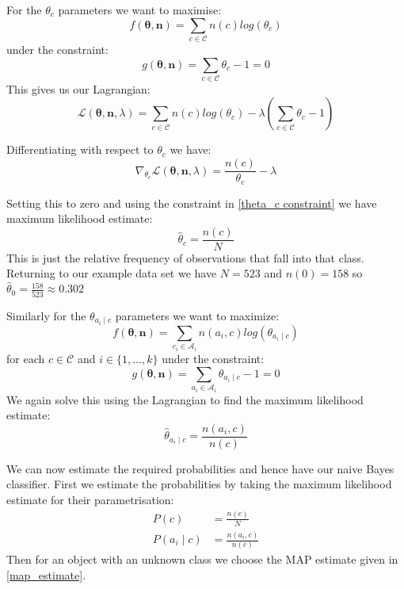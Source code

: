 For the $\theta_c$ parameters we want to maximise:
\begin{equation}
	f(\mathbf{\theta}, \mathbf{n}) = \sum_{c \in \mathcal{C}}  n(c)log(\theta_c)
\end{equation}
under the constraint:
\begin{equation}\label{theta_c constraint}
	g(\mathbf{\theta}, \mathbf{n}) = \sum_{c \in \mathcal{C}}  \theta_c - 1 = 0
\end{equation}
This gives us our Lagrangian:
\begin{equation}
	\mathcal{L}(\mathbf{\theta}, \mathbf{n}, \lambda) = \sum_{c \in \mathcal{C}}  n(c)log(\theta_c) - \lambda(\sum_{c \in \mathcal{C}}  \theta_c - 1)
\end{equation}

Differentiating with respect to $\theta_c$ we have:
\begin{equation}
	\nabla_{\theta_c} \mathcal{L}(\mathbf{\theta}, \mathbf{n}, \lambda) = \frac{n(c)}{\theta_c} - \lambda
\end{equation}

Setting this to zero and using the constraint in \cref{theta_c constraint} we have maximum likelihood estimate:
\begin{equation}
	\hat\theta_c = \frac{n(c)}{N}
\end{equation}
This is just the relative frequency of observations that fall into that class.
Returning to our example data set we have $N=523$ and $n(0)=158$ so $\hat\theta_0 = \frac{158}{523} \approx 0.302$

Similarly for the $\theta_{a_i \mid c}$ parameters we want to maximize:
\begin{equation}
	f(\mathbf{\theta}, \mathbf{n}) = \sum_{c_i \in \mathcal{A}_i} n(a_i, c) log(\theta_{a_i \mid c})
\end{equation}
for each $c \in \mathcal{C}$ and $i \in \{1,\dots,k\}$ under the constraint:
\begin{equation}
	g(\mathbf{\theta}, \mathbf{n}) = \sum_{a_i \in \mathcal{A}_i}  \theta_{a_i \mid c} - 1 = 0
\end{equation}
We again solve this using the Lagrangian to find the maximum likelihood estimate:
\begin{equation}
	\hat\theta_{a_i \mid c} = \frac{n(a_i, c)}{n(c)}
\end{equation}

We can now estimate the required probabilities and hence have our naive Bayes classifier.
First we estimate the probabilities by taking the maximum likelihood estimate for their parametrisation:
\begin{align}
	P(c) & = \frac{n(c)}{N} \\
	P(a_i \mid c) & = \frac{n(a_i, c)}{n(c)}
\end{align}
Then for an object with an unknown class we choose the MAP estimate given in \cref{map_estimate}.

